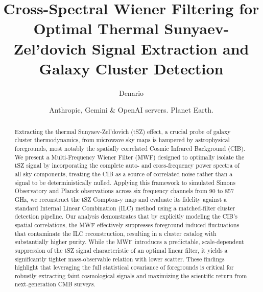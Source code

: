 \documentclass[]{article}
\begin{document}
\title{Cross-Spectral Wiener Filtering for Optimal Thermal Sunyaev-Zel'dovich Signal Extraction and Galaxy Cluster Detection}

\author{Denario}
\date{Anthropic, Gemini \& OpenAI servers. Planet Earth.}

\maketitle
\begin{abstract}
Extracting the thermal Sunyaev-Zel'dovich (tSZ) effect, a crucial probe of galaxy cluster thermodynamics, from microwave sky maps is hampered by astrophysical foregrounds, most notably the spatially correlated Cosmic Infrared Background (CIB). We present a Multi-Frequency Wiener Filter (MWF) designed to optimally isolate the tSZ signal by incorporating the complete auto- and cross-frequency power spectra of all sky components, treating the CIB as a source of correlated noise rather than a signal to be deterministically nulled. Applying this framework to simulated Simons Observatory and Planck observations across six frequency channels from 90 to 857 GHz, we reconstruct the tSZ Compton-y map and evaluate its fidelity against a standard Internal Linear Combination (ILC) method using a matched-filter cluster detection pipeline. Our analysis demonstrates that by explicitly modeling the CIB's spatial correlations, the MWF effectively suppresses foreground-induced fluctuations that contaminate the ILC reconstruction, resulting in a cluster catalog with substantially higher purity. While the MWF introduces a predictable, scale-dependent suppression of the tSZ signal characteristic of an optimal linear filter, it yields a significantly tighter mass-observable relation with lower scatter. These findings highlight that leveraging the full statistical covariance of foregrounds is critical for robustly extracting faint cosmological signals and maximizing the scientific return from next-generation CMB surveys.
\end{abstract}
\end{document}
